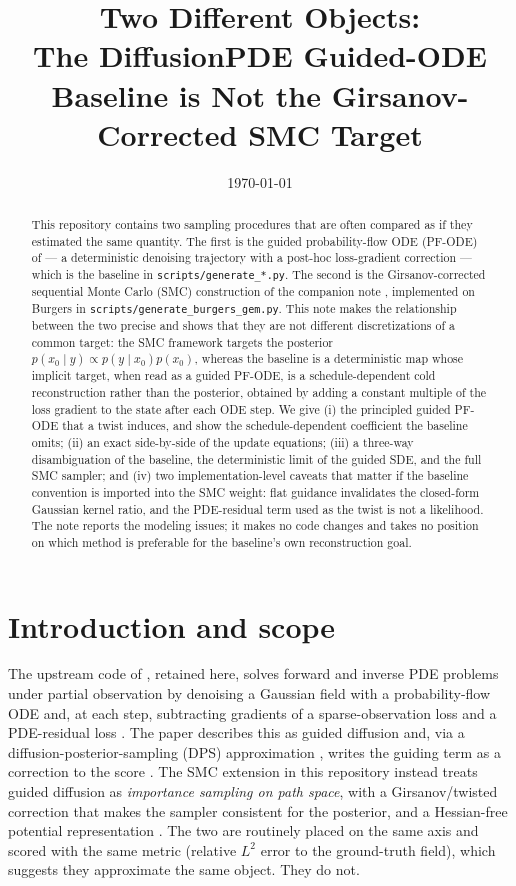 \documentclass[11pt]{article}
\title{Two Different Objects:\\
The DiffusionPDE Guided-ODE Baseline is Not the Girsanov-Corrected SMC Target}
\author{}
\date{\today}
\begin{document}
\maketitle

\begin{abstract}
This repository contains two sampling procedures that are often compared as if they estimated the
same quantity. The first is the guided probability-flow ODE (PF-ODE) of
\citet{huang2024diffusionpde} --- a deterministic denoising trajectory with a post-hoc
loss-gradient correction --- which is the baseline in \texttt{scripts/generate\_*.py}. The second is
the Girsanov-corrected sequential Monte Carlo (SMC) construction of the companion note
\citep{note1}, implemented on Burgers in \texttt{scripts/generate\_burgers\_gem.py}. This note makes
the relationship between the two precise and shows that they are not different discretizations of a
common target: the SMC framework targets the posterior $p(x_0\mid y)\propto p(y\mid x_0)p(x_0)$,
whereas the baseline is a deterministic map whose implicit target, when read as a guided PF-ODE, is
a schedule-dependent cold reconstruction rather than the posterior, obtained by adding a
constant multiple of the loss gradient to the state after each ODE step. We give (i) the principled
guided PF-ODE that a twist induces, and show the schedule-dependent coefficient the baseline omits;
(ii) an exact side-by-side of the update equations; (iii) a three-way disambiguation of the
baseline, the deterministic limit of the guided SDE, and the full SMC sampler; and (iv) two
implementation-level caveats that matter if the baseline convention is imported into the SMC weight:
flat guidance invalidates the closed-form Gaussian kernel ratio, and the PDE-residual term used as
the twist is not a likelihood. The note reports the modeling issues; it makes no code changes and
takes no position on which method is preferable for the baseline's own reconstruction goal.
\end{abstract}

\section{Introduction and scope}\label{sec:intro}

The upstream code of \citet{huang2024diffusionpde}, retained here, solves forward and inverse PDE
problems under partial observation by denoising a Gaussian field with a probability-flow ODE and, at
each step, subtracting gradients of a sparse-observation loss and a PDE-residual loss
\citep[Algorithm~1]{huang2024diffusionpde}. The paper describes this as guided diffusion and, via a
diffusion-posterior-sampling (DPS) approximation \citep{chung2023dps}, writes the guiding term as a
correction to the score \citep[Eq.~(8)]{huang2024diffusionpde}. The SMC extension in this repository
\citep{note1,note2} instead treats guided diffusion as \emph{importance sampling on path space},
with a Girsanov/twisted correction that makes the sampler consistent for the posterior, and a
Hessian-free potential representation \citep{note2,note3}. The two are routinely placed on the same
axis and scored with the same metric (relative $L^2$ error to the ground-truth field), which
suggests they approximate the same object. They do not.
\end{document}
